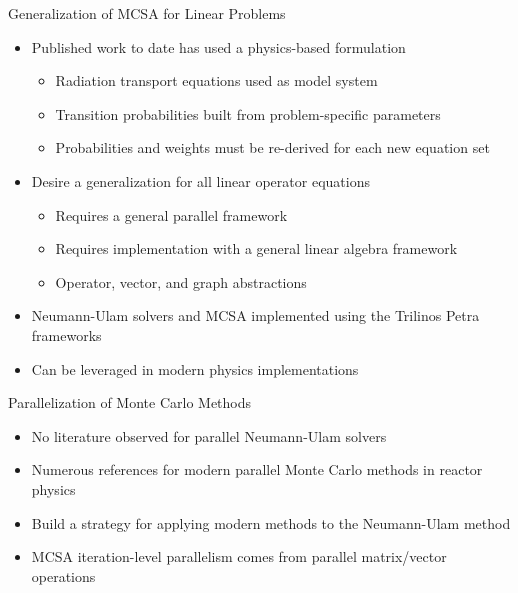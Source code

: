 \documentclass{beamer}
\begin{document}
\begin{frame}{Generalization of MCSA for Linear Problems}

  \begin{itemize}
  \item Published work to date has used a physics-based formulation
    \begin{itemize}
    \item Radiation transport equations used as model system
    \item Transition probabilities built from problem-specific
      parameters
    \item Probabilities and weights must be re-derived for each new
      equation set
    \end{itemize}
  \item Desire a generalization for all linear operator equations
    \begin{itemize}
    \item Requires a general parallel framework
    \item Requires implementation with a general linear algebra
      framework
    \item Operator, vector, and graph abstractions
    \end{itemize}
  \item Neumann-Ulam solvers and MCSA implemented using the Trilinos
    Petra frameworks
  \item Can be leveraged in modern physics implementations
  \end{itemize}

\end{frame}

\begin{frame}{Parallelization of Monte Carlo Methods}

  \begin{itemize}
  \item No literature observed for parallel Neumann-Ulam solvers
  \item Numerous references for modern parallel Monte Carlo methods in
    reactor physics
  \item Build a strategy for applying modern methods to the
    Neumann-Ulam method
  \item MCSA iteration-level parallelism comes from parallel
    matrix/vector operations
  \end{itemize}

\end{frame}
\end{document}
